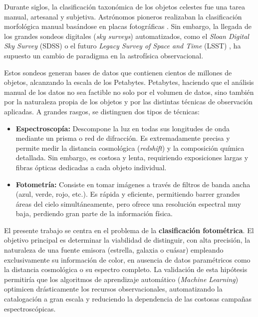 \documentclass[12pt, a4paper]{report}
\begin{document}
Durante siglos, la clasificación taxonómica de los objetos celestes fue una tarea manual, artesanal y subjetiva. Astrónomos pioneros realizaban la clasificación morfológica manual basándose en placas fotográficas \citep{Hubble1926}. Sin embargo, la llegada de los grandes sondeos digitales (\textit{sky surveys}) automatizados, como el \textit{Sloan Digital Sky Survey} (SDSS) \citep{York2000} o el futuro \textit{Legacy Survey of Space and Time} (LSST) \citep{Ivezic2019}, ha supuesto un cambio de paradigma en la astrofísica observacional.

Estos sondeos generan bases de datos que contienen cientos de millones de objetos, alcanzando la escala de los Petabytes. Petabytes, haciendo que el análisis manual de los datos no sea factible no solo por el volumen de datos, sino también por la naturaleza propia de los objetos y por las distintas técnicas de observación aplicadas. A grandes rasgos, se distinguen dos tipos de técnicas:

\begin{itemize}
    \item \textbf{Espectroscopía:} Descompone la luz en todas sus longitudes de onda mediante un prisma o red de difracción. Es extremadamente precisa y permite medir la distancia cosmológica (\textit{redshift}) y la composición química detallada. Sin embargo, es costosa y lenta, requiriendo exposiciones largas y fibras ópticas dedicadas a cada objeto individual.
    \item \textbf{Fotometría:} Consiste en tomar imágenes a través de filtros de banda ancha (azul, verde, rojo, etc.). Es rápida y eficiente, permitiendo barrer grandes áreas del cielo simultáneamente, pero ofrece una resolución espectral muy baja, perdiendo gran parte de la información física.
\end{itemize}

El presente trabajo se centra en el problema de la \textbf{clasificación fotométrica}. El objetivo principal es determinar la viabilidad de distinguir, con alta precisión, la naturaleza de una fuente emisora (estrella, galaxia o cuásar) empleando exclusivamente su información de color, en ausencia de datos paramétricos como la distancia cosmológica o su espectro completo. La validación de esta hipótesis permitiría que los algoritmos de aprendizaje automático (\textit{Machine Learning}) optimicen drásticamente los recursos observacionales, automatizando la catalogación a gran escala y reduciendo la dependencia de las costosas campañas espectroscópicas.
\end{document}
